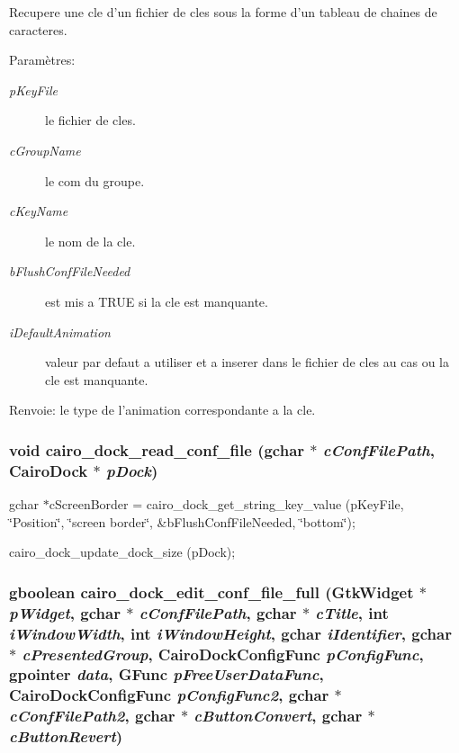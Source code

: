 Recupere une cle d'un fichier de cles sous la forme d'un tableau de chaines de caracteres. \begin{Desc}
\item[Param\`{e}tres:]
\begin{description}
\item[{\em p\-Key\-File}]le fichier de cles. \item[{\em c\-Group\-Name}]le com du groupe. \item[{\em c\-Key\-Name}]le nom de la cle. \item[{\em b\-Flush\-Conf\-File\-Needed}]est mis a TRUE si la cle est manquante. \item[{\em i\-Default\-Animation}]valeur par defaut a utiliser et a inserer dans le fichier de cles au cas ou la cle est manquante. \end{description}
\end{Desc}
\begin{Desc}
\item[Renvoie:]le type de l'animation correspondante a la cle. \end{Desc}
\subsubsection{\setlength{\rightskip}{0pt plus 5cm}void cairo\_\-dock\_\-read\_\-conf\_\-file (gchar $\ast$ {\em c\-Conf\-File\-Path}, {\bf Cairo\-Dock} $\ast$ {\em p\-Dock})}\label{cairo-dock-config_8c_c64f3ee3060851d08a10b674983ceef6}


gchar $\ast$c\-Screen\-Border = cairo\_\-dock\_\-get\_\-string\_\-key\_\-value (p\-Key\-File, \char`\"{}Position\char`\"{}, \char`\"{}screen border\char`\"{}, \&b\-Flush\-Conf\-File\-Needed, \char`\"{}bottom\char`\"{});

cairo\_\-dock\_\-update\_\-dock\_\-size (p\-Dock); 
\subsubsection{\setlength{\rightskip}{0pt plus 5cm}gboolean cairo\_\-dock\_\-edit\_\-conf\_\-file\_\-full (Gtk\-Widget $\ast$ {\em p\-Widget}, gchar $\ast$ {\em c\-Conf\-File\-Path}, gchar $\ast$ {\em c\-Title}, int {\em i\-Window\-Width}, int {\em i\-Window\-Height}, gchar {\em i\-Identifier}, gchar $\ast$ {\em c\-Presented\-Group}, {\bf Cairo\-Dock\-Config\-Func} {\em p\-Config\-Func}, gpointer {\em data}, GFunc {\em p\-Free\-User\-Data\-Func}, {\bf Cairo\-Dock\-Config\-Func} {\em p\-Config\-Func2}, gchar $\ast$ {\em c\-Conf\-File\-Path2}, gchar $\ast$ {\em c\-Button\-Convert}, gchar $\ast$ {\em c\-Button\-Revert})}\label{cairo-dock-config_8c_4a1db70ca82116e654ad3de0a2b40791}


